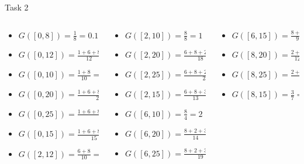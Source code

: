 \begin{frame}[allowframebreaks]{Task 2}{}
\begin{solutionnoinc}
\begin{ganttchart}
    \end{ganttchart}
  \end{solutionnoinc}
  \begin{solutionnoinc}
    \tiny
    \begin{columns}
      \begin{column}{0.33\textwidth}
        \begin{itemize}
          \item $G([0, 8]) = \frac{1}{8} = 0.125$
          \item $G([0, 12]) = \frac{1+6+8}{12} = 1.25$
          \item $G([0, 10]) = \frac{1+8}{10} = 0.9$
          \item $G([0, 20]) = \frac{1+6+8+2+3}{20} = 1$
          \item $G([0, 25]) = \frac{1+6+8+2+3+5}{25} = 1$
          \item $G([0, 15]) = \frac{1+6+8+3}{15} = 1.2$
          \item $G([2, 12]) = \frac{6+8}{10} = 1.4$
        \end{itemize}
      \end{column}
      \begin{column}{0.33\textwidth}
        \begin{itemize}
          \item $G([2, 10]) = \frac{8}{8} = 1$
          \item $G([2, 20]) = \frac{6+8+2+3}{18} = 1.06$
          \item $G([2, 25]) = \frac{6+8+2+3+5}{23} = 1.04$
          \item $G([2, 15]) = \frac{6+8+3}{13} = 1.31$
          \item $\boxed{G([6, 10]) = \frac{8}{4} = 2}$
          \item $G([6, 20]) = \frac{8+2+3}{14} = 0.93$
          \item $G([6, 25]) = \frac{8+2+3+5}{19} = 0.95$
        \end{itemize}
      \end{column}
      \begin{column}{0.33\textwidth}
        \begin{itemize}
          \item $G([6, 15]) = \frac{8+3}{9} = 1.22$
          \item $G([8, 20]) = \frac{2+3}{12} = 0.42$
          \item $G([8, 25]) = \frac{2+3+5}{17} = 0.59$
          \item $G([8, 15]) = \frac{3}{7} = 0.43$

\end{itemize}
\end{column}
\end{columns}
\end{solutionnoinc}
\end{frame}

